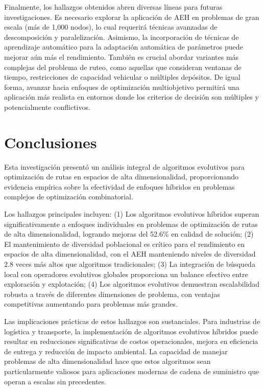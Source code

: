 \documentclass[10pt,a4paper]{article}
\begin{document}
\begin{multicols}{2}
Finalmente, los hallazgos obtenidos abren diversas líneas para futuras investigaciones. Es necesario explorar la aplicación de AEH en problemas de gran escala (más de 1,000 nodos), lo cual requerirá técnicas avanzadas de descomposición y paralelización. Asimismo, la incorporación de técnicas de aprendizaje automático para la adaptación automática de parámetros puede mejorar aún más el rendimiento. También es crucial abordar variantes más complejas del problema de ruteo, como aquellas que consideran ventanas de tiempo, restricciones de capacidad vehicular o múltiples depósitos. De igual forma, avanzar hacia enfoques de optimización multiobjetivo permitirá una aplicación más realista en entornos donde los criterios de decisión son múltiples y potencialmente conflictivos.




\section{Conclusiones}

Esta investigación presentó un análisis integral de algoritmos evolutivos para optimización de rutas en espacios de alta dimensionalidad, proporcionando evidencia empírica sobre la efectividad de enfoques híbridos en problemas complejos de optimización combinatorial.

Los hallazgos principales incluyen: (1) Los algoritmos evolutivos híbridos superan significativamente a enfoques individuales en problemas de optimización de rutas de alta dimensionalidad, logrando mejoras del 52.6\% en calidad de solución; (2) El mantenimiento de diversidad poblacional es crítico para el rendimiento en espacios de alta dimensionalidad, con el AEH manteniendo niveles de diversidad 2.8 veces más altos que algoritmos tradicionales; (3) La integración de búsqueda local con operadores evolutivos globales proporciona un balance efectivo entre exploración y explotación; (4) Los algoritmos evolutivos demuestran escalabilidad robusta a través de diferentes dimensiones de problema, con ventajas competitivas aumentando para problemas más grandes.

Las implicaciones prácticas de estos hallazgos son sustanciales. Para industrias de logística y transporte, la implementación de algoritmos evolutivos híbridos puede resultar en reducciones significativas de costos operacionales, mejora en eficiencia de entrega y reducción de impacto ambiental. La capacidad de manejar problemas de alta dimensionalidad hace que estos algoritmos sean particularmente valiosos para aplicaciones modernas de cadena de suministro que operan a escalas sin precedentes.


\end{multicols}
\end{document}
